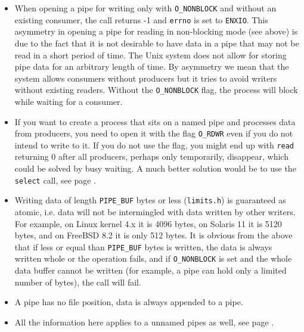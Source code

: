 \begin{itemize}
\item When opening a pipe for writing only with \texttt{O\_NONBLOCK} and without
an existing consumer, the call returns -1 and \texttt{errno} is set to
\texttt{ENXIO}.  This asymmetry in opening a pipe for reading in non-blocking
mode (see above) is due to the fact that it is not desirable to have data in a
pipe that may not be read in a short period of time.  The Unix system does not
allow for storing pipe data for an arbitrary length of time.  By asymmetry we
mean that the system allows consumers without producers but it tries to avoid
writers without existing readers.  Without the \texttt{O\_NONBLOCK} flag, the
process will block while waiting for a consumer.
\item  If you want to create a process that sits on a named pipe and processes
data from producers, you need to open it with the flag \texttt{O\_RDWR} even
if you do not intend to write to it.  If you do not use the flag, you might end
up with \texttt{read} returning 0 after all producers, perhaps only temporarily,
disappear, which could be solved by busy waiting.  A much better solution would
be to use the \texttt{select} call, see page \pageref{SELECT}.
\item Writing data of length \texttt{PIPE\_BUF} bytes or less
(\texttt{limits.h}) is guaranteed as atomic, i.e. data will not be intermingled
with data written by other writers.  For example, on Linux kernel 4.x it is 4096
bytes, on Solaris 11 it is 5120 bytes, and on FreeBSD 8.2 it is only 512 bytes.
It is obvious from the above that if less or equal than \texttt{PIPE\_BUF}
bytes is written, the data is always written whole or the operation fails,
and if \texttt{O\_NONBLOCK} is set and the whole data buffer cannot be written
(for example, a pipe can hold only a limited number of bytes), the call will fail.
\item A pipe has no file position, data is always appended to a pipe.
\item All the information here applies to a unnamed pipes as well, see page
\pageref{PIPE}.
\end{itemize}



